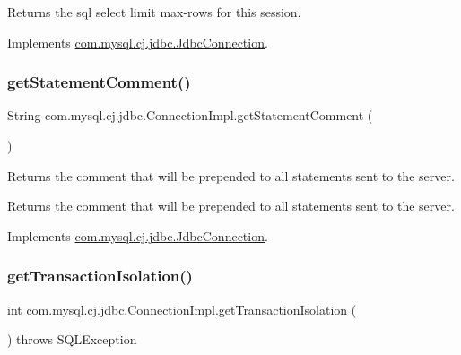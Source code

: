 Returns the sql select limit max-\/rows for this session. 

Implements \mbox{\hyperlink{interfacecom_1_1mysql_1_1cj_1_1jdbc_1_1_jdbc_connection}{com.\+mysql.\+cj.\+jdbc.\+Jdbc\+Connection}}.

\mbox{\label{classcom_1_1mysql_1_1cj_1_1jdbc_1_1_connection_impl_a4ac13f311c3ef1e5e6718b17f3b5e090}} 
\subsubsection{\texorpdfstring{get\+Statement\+Comment()}{getStatementComment()}}
{\footnotesize\ttfamily String com.\+mysql.\+cj.\+jdbc.\+Connection\+Impl.\+get\+Statement\+Comment (\begin{DoxyParamCaption}{ }\end{DoxyParamCaption})}

Returns the comment that will be prepended to all statements sent to the server.

\begin{DoxyReturn}{Returns}
the comment that will be prepended to all statements sent to the server. 
\end{DoxyReturn}


Implements \mbox{\hyperlink{interfacecom_1_1mysql_1_1cj_1_1jdbc_1_1_jdbc_connection_a11233536b54479183feb8eda938f72e9}{com.\+mysql.\+cj.\+jdbc.\+Jdbc\+Connection}}.

\mbox{\label{classcom_1_1mysql_1_1cj_1_1jdbc_1_1_connection_impl_aa92a66e7ffd147ccf70a80fb47601760}} 
\subsubsection{\texorpdfstring{get\+Transaction\+Isolation()}{getTransactionIsolation()}}
{\footnotesize\ttfamily int com.\+mysql.\+cj.\+jdbc.\+Connection\+Impl.\+get\+Transaction\+Isolation (\begin{DoxyParamCaption}{ }\end{DoxyParamCaption}) throws S\+Q\+L\+Exception}

